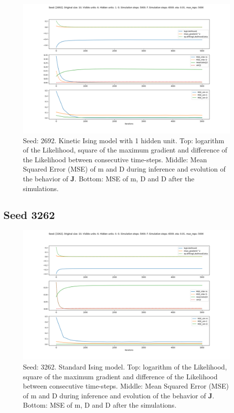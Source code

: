 \documentclass{article}
\def\*#1{\mathbf{#1}}
\begin{document}
\begin{figure}[!htb]
    \centering
    \includegraphics[width=0.8\linewidth]{images/sqrt_size/[2692]_10_6_1_5000_6500_eta001_5000_100.png}
\caption{Seed: 2692. Kinetic Ising model with 1 hidden unit. Top: logarithm of the Likelihood, square of the maximum gradient and difference of the Likelihood between consecutive time-steps. Middle: Mean Squared Error (MSE) of m and D during inference and evolution of the behavior of $\*J$. Bottom: MSE of m, D and D after the simulations.}
\end{figure}



\newpage
\subsection{Seed 3262}

\begin{figure}[!htb]
    \centering
    \includegraphics[width=0.8\linewidth]{images/sqrt_size/[3262]_10_6_0_5000_6500_eta001_5000_100.png}
\caption{Seed: 3262. Standard Ising model. Top: logarithm of the Likelihood, square of the maximum gradient and difference of the Likelihood between consecutive time-steps. Middle: Mean Squared Error (MSE) of m and D during inference and evolution of the behavior of $\*J$. Bottom: MSE of m, D and D after the simulations.}
\end{figure}
\end{document}
